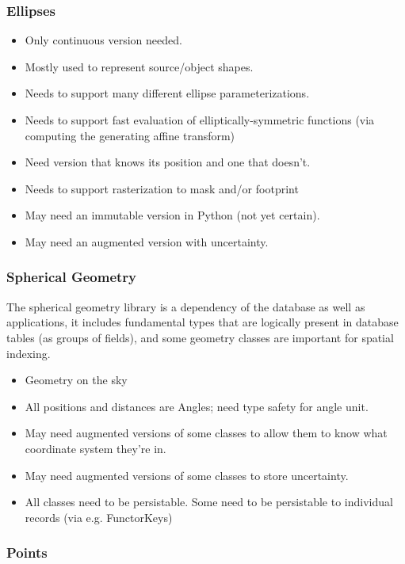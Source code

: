 \subsubsection{Ellipses}
\label{sec:spCartesianEllipses}

\begin{itemize}
\item Only continuous version needed.
\item Mostly used to represent source/object shapes.
\item Needs to support many different ellipse parameterizations.
\item Needs to support fast evaluation of elliptically-symmetric functions (via computing the generating affine transform)
\item Need version that knows its position and one that doesn't.
\item Needs to support rasterization to mask and/or footprint
\item May need an immutable version in Python (not yet certain).
\item May need an  augmented version with uncertainty.
\end{itemize}


\subsubsection{Spherical Geometry}
\label{sec:spSphericalGeometry}

The spherical geometry library is a dependency of the database as well as applications, it includes fundamental types that are logically present in database tables (as groups of fields), and some geometry classes are important for spatial indexing.

\begin{itemize}
\item Geometry on the sky
\item All positions and distances are Angles; need type safety for angle unit.
\item May need augmented versions of some classes to allow them to know what coordinate system they're in.
\item May need augmented versions of some classes to store uncertainty.
\item All classes need to be persistable.  Some need to be persistable to individual records (via e.g. FunctorKeys)
\end{itemize}

\subsubsection{Points}
\label{sec:spSphericalPoints}

